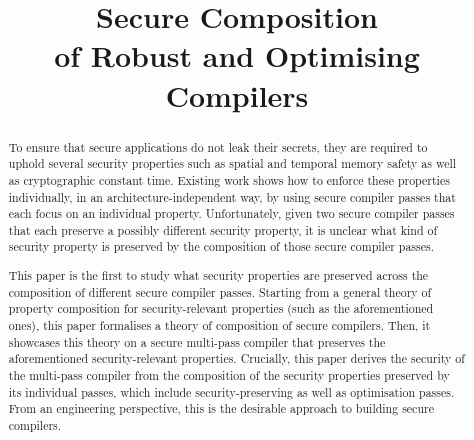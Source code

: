 \documentclass[dvipsnames,conference]{IEEEtran}
\theoremstyle{definition}
\begin{document}
\linenumbers

\title{Secure Composition \\ of Robust and Optimising Compilers}

\author{}

\maketitle

\begin{abstract}
To ensure that secure applications do not leak their secrets, they are required to uphold several security properties such as spatial and temporal memory safety as well as cryptographic constant time.
Existing work shows how to enforce these properties individually, in an architecture-independent way, by using secure compiler passes that each focus on an individual property.
Unfortunately, given two secure compiler passes that each preserve a possibly different security property, it is unclear what kind of security property is preserved by the composition of those secure compiler passes.

This paper is the first to study what security properties are preserved across the composition of different secure compiler passes.
Starting from a general theory of property composition for security-relevant properties (such as the aforementioned ones), this paper formalises a theory of composition of secure compilers.
Then, it showcases this theory on a secure multi-pass compiler that preserves the aforementioned security-relevant properties.
Crucially, this paper derives the security of the multi-pass compiler from the composition of the security properties preserved by its individual passes, which include security-preserving as well as optimisation passes.
% 
From an engineering perspective, this is the desirable approach to building secure compilers.



\end{abstract}
\end{document}
